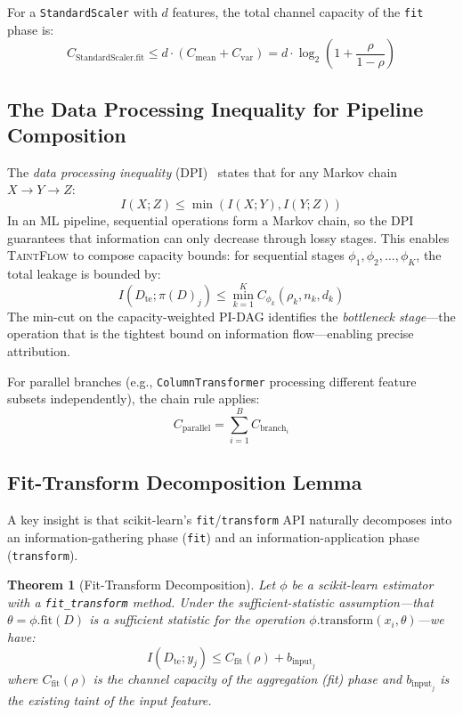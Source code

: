 \documentclass[11pt]{article}
\newtheorem{theorem}{Theorem}
\begin{document}
For a \texttt{StandardScaler} with $d$ features, the total channel
capacity of the \texttt{fit} phase is:
\begin{equation}
C_{\text{StandardScaler.fit}} \leq d \cdot (C_{\text{mean}} + C_{\text{var}}) = d \cdot \log_2\left(1 + \frac{\rho}{1 - \rho}\right)
\end{equation}

\subsection{The Data Processing Inequality for Pipeline Composition}

The \emph{data processing inequality} (DPI)~\cite{cover2006} states that
for any Markov chain $X \to Y \to Z$:
\begin{equation}
I(X; Z) \leq \min(I(X; Y), I(Y; Z))
\end{equation}
In an ML pipeline, sequential operations form a Markov chain, so the
DPI guarantees that information can only decrease through lossy stages.
This enables \textsc{TaintFlow} to compose capacity bounds:
for sequential stages $\phi_1, \phi_2, \ldots, \phi_K$, the total
leakage is bounded by:
\begin{equation}
I(D_{\text{te}}; \pi(D)_j) \leq \min_{k=1}^{K} C_{\phi_k}(\rho_k, n_k, d_k)
\end{equation}
The min-cut on the capacity-weighted PI-DAG identifies the
\emph{bottleneck stage}---the operation that is the tightest bound on
information flow---enabling precise attribution.

For parallel branches (e.g., \texttt{ColumnTransformer} processing
different feature subsets independently), the chain rule applies:
\begin{equation}
C_{\text{parallel}} = \sum_{i=1}^{B} C_{\text{branch}_i}
\end{equation}

\subsection{Fit-Transform Decomposition Lemma}

A key insight is that scikit-learn's \texttt{fit}/\texttt{transform}
API naturally decomposes into an information-gathering phase
(\texttt{fit}) and an information-application phase
(\texttt{transform}).

\begin{theorem}[Fit-Transform Decomposition]
Let $\phi$ be a scikit-learn estimator with a \texttt{fit\_transform}
method.  Under the \emph{sufficient-statistic assumption}---that
$\theta = \phi.\text{fit}(D)$ is a sufficient statistic for the
operation $\phi.\text{transform}(x_i, \theta)$---we have:
\begin{equation}
I(D_{\text{te}}; y_j) \leq C_{\text{fit}}(\rho) + b_{\text{input}_j}
\end{equation}
where $C_{\text{fit}}(\rho)$ is the channel capacity of the aggregation
(fit) phase and $b_{\text{input}_j}$ is the existing taint of the
input feature.
\end{theorem}
\end{document}
